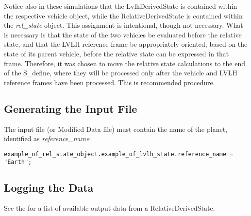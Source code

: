 Notice also in these simulations that the LvlhDerivedState is contained within the respective vehicle object, while the RelativeDerivedState is contained within the \textit{rel\_state} object.  This assignment is intentional, though not necessary.  What is necessary is that the state of the two vehicles be evaluated before the relative state, and that the LVLH reference frame be appropriately oriented, based on the state of its parent vehicle, before the relative state can be expressed in that frame.  Therefore, it was chosen to move the relative state calculations to the end of the S\_define, where they will be processed only after the vehicle and LVLH reference frames have been processed.  This is recommended procedure.

\subsection{Generating the Input File}
The input file (or Modified Data file) must contain the name of the planet, identified as \textit{reference\_name}:
\begin{verbatim}
example_of_rel_state_object.example_of_lvlh_state.reference_name = "Earth";
\end{verbatim}

\subsection{Logging the Data}
See the  for a list of available output data from a RelativeDerivedState.